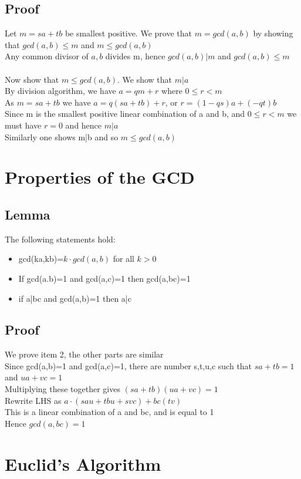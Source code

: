 \documentclass{article}[18pt]
\begin{document}
\subsection{Proof}
Let $m=sa+tb$ be smallest positive. We prove that $m=gcd(a,b)$ by showing that $gcd(a,b)\leqslant m$ and $m\leqslant gcd(a,b)$\\
Any common divisor of $a,b$ divides m, hence $gcd(a,b)|m$ and $gcd(a,b)\leqslant m$\\
\\
Now show that $m\leqslant gcd(a,b)$. We show that $m|a$\\
By division algorithm, we have $a=qm+r$ where $0\leqslant r<m$\\
As $m=sa+tb$ we have $a=q(sa+tb)+r$, or $r=(1-qs)a+(-qt)b$\\
Since m is the smallest positive linear combination of a and b, and $0\leqslant r< m$ we must have $r=0$ and hence $m|a$\\
Similarly one shows m|b and so $m\leqslant gcd(a,b)$
\section{Properties of the GCD}
\subsection{Lemma}
The following statements hold:
\begin{itemize}
	\item gcd(ka,kb)=$k\cdot gcd (a,b)$ for all $k>0$
	\item If gcd(a.b)=1 and gcd(a,c)=1 then gcd(a,bc)=1
	\item if a|bc and gcd(a,b)=1 then a|c
\end{itemize}
\subsection{Proof}
We prove item 2, the other parts are similar\\
Since gcd(a,b)=1 and gcd(a,c)=1, there are number s,t,u,c such that $sa+tb=1$ and $ua+vc=1$\\
Multiplying these together gives $(sa+tb)(ua+vc)=1$\\
Rewrite LHS as $a\cdot(sau+tbu+svc)+bc(tv)$\\
This is a linear combination of a and bc, and is equal to 1\\
Hence $gcd(a,bc)=1$
\section{Euclid's Algorithm}
\end{document}
